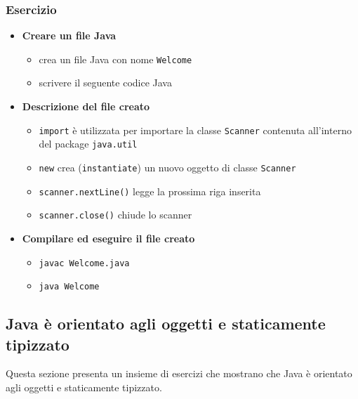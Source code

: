\documentclass{article}
\theoremstyle{definition}
\begin{document}
\subsubsection{Esercizio}

\begin{itemize}
\item \textbf{Creare un file Java}
\begin{itemize}
\item crea un file Java con nome \texttt{Welcome}
\item scrivere il seguente codice Java
\end{itemize}
\end{itemize}


\begin{itemize}
\item \textbf{Descrizione del file creato}
\begin{itemize}
\item \texttt{import} \`e utilizzata per importare la classe \texttt{Scanner} contenuta all'interno del package \texttt{java.util}
\item \texttt{new} crea (\texttt{instantiate}) un nuovo oggetto di classe \texttt{Scanner}
\item \texttt{scanner.nextLine()} legge la prossima riga inserita
\item \texttt{scanner.close()} chiude lo scanner
\end{itemize}
\end{itemize}

\begin{itemize}
\item  \textbf{Compilare ed eseguire il file creato}
\begin{itemize}
\item \texttt{javac Welcome.java}
\item \texttt{java Welcome}
\end{itemize}
\end{itemize}

\subsection{Java \`e orientato agli oggetti e staticamente tipizzato}
Questa sezione presenta un insieme di esercizi che mostrano che Java \`e orientato agli oggetti e staticamente tipizzato.
\end{document}
